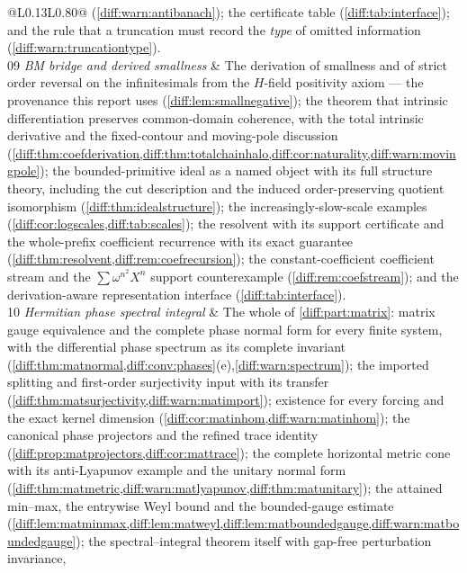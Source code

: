 \documentclass[11pt,letterpaper]{article}
\numberwithin{equation}{section}
\theoremstyle{definition}
\theoremstyle{remark}
\begin{document}
\begin{longtable}{@{}L{0.13\textwidth}L{0.80\textwidth}@{}}
(\cref{diff:warn:antibanach}); the certificate table
(\cref{diff:tab:interface}); and the rule that a truncation must record the
\emph{type} of omitted information
(\cref{diff:warn:truncationtype}). \\[0.3em]
09 \newline\emph{BM bridge and derived smallness} &
The derivation of smallness and of strict order reversal on the
infinitesimals from the $H$-field positivity axiom --- the provenance this
report uses (\cref{diff:lem:smallnegative}); the theorem that intrinsic
differentiation preserves common-domain coherence, with the total intrinsic
derivative and the fixed-contour and moving-pole discussion
(\cref{diff:thm:coefderivation,diff:thm:totalchainhalo,diff:cor:naturality,diff:warn:movingpole});
the bounded-primitive ideal as a named object with its full structure theory,
including the cut description and the induced order-preserving quotient
isomorphism (\cref{diff:thm:idealstructure});
the increasingly-slow-scale examples
(\cref{diff:cor:logscales,diff:tab:scales}); the resolvent with its support
certificate and the whole-prefix coefficient recurrence with its exact
guarantee (\cref{diff:thm:resolvent,diff:rem:coefrecursion}); the
constant-coefficient coefficient stream and the
$\sum\omega^{n^{2}}X^{n}$ support counterexample
(\cref{diff:rem:coefstream}); and the derivation-aware representation
interface (\cref{diff:tab:interface}). \\[0.3em]
10 \newline\emph{Hermitian phase spectral integral} &
The whole of \cref{diff:part:matrix}: matrix gauge equivalence and the complete
phase normal form for every finite system, with the differential phase spectrum
as its complete invariant
(\cref{diff:thm:matnormal,diff:conv:phases}(e),\cref{diff:warn:spectrum});
the imported splitting and first-order surjectivity input with its transfer
(\cref{diff:thm:matsurjectivity,diff:warn:matimport}); existence for every
forcing and the exact kernel dimension
(\cref{diff:cor:matinhom,diff:warn:matinhom}); the canonical phase projectors
and the refined trace identity
(\cref{diff:prop:matprojectors,diff:cor:mattrace}); the complete horizontal
metric cone with its anti-Lyapunov example and the unitary normal form
(\cref{diff:thm:matmetric,diff:warn:matlyapunov,diff:thm:matunitary}); the
attained min--max, the entrywise Weyl bound and the bounded-gauge estimate
(\cref{diff:lem:matminmax,diff:lem:matweyl,diff:lem:matboundedgauge,diff:warn:matboundedgauge});
the spectral--integral theorem itself with gap-free perturbation invariance,

\end{longtable}
\end{document}
